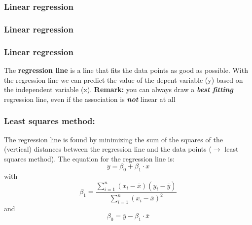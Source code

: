 \documentclass{beamer}
\begin{document}
\begin{frame}
  \frametitle{Linear regression}
  \centering
\end{frame}

\begin{frame}
  \frametitle{Linear regression}
  \centering
\end{frame}

\begin{frame}
\frametitle{Linear regression}
\vfill
The \textbf{regression line} is a line that fits the data points as good as possible.
\vfill
With the regression line we can predict the value of the depent variable (y) based on the independent variable (x).
\vfill
\textbf{Remark:} you can always draw a \textbf{\textit{best fitting}} regression line, even if the association is \textit{\textbf{not}} linear at all
\end{frame}


\begin{frame}
\frametitle{Least squares method:}
The regression line is found by minimizing the sum of the squares of the (vertical) distances
between the regression line and the data points ($\rightarrow$ least squares method).
\vfill
The equation for the regression line is:
\[ y = \beta_0 + \beta_1 \cdot x \]
with
\[ \beta_1 = \frac{\sum_{i=1}^{n}(x_i - \overline{x})(y_i - \overline{y})}{\sum_{i=1}^{n}(x_i - \overline{x})^2} \]
and
\[ \beta_0 = \overline{y} - \beta_1 \cdot \overline{x} \]

\end{frame}
\end{document}
